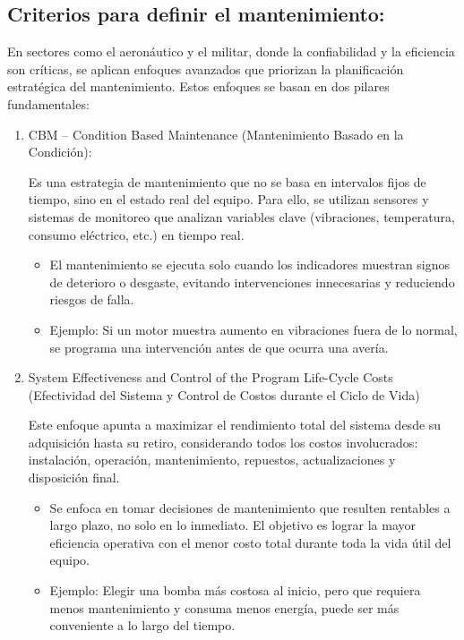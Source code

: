 \documentclass[a4paper,oneside,11pt]{article}
\begin{document}
\subsection{Criterios para definir el mantenimiento:}
En sectores como el aeronáutico y el militar, donde la confiabilidad y la eficiencia son críticas, se aplican enfoques avanzados que priorizan la planificación estratégica del mantenimiento. Estos enfoques se basan en dos pilares fundamentales:
\begin{enumerate}
    \item CBM – Condition Based Maintenance (Mantenimiento Basado en la Condición):

    Es una estrategia de mantenimiento que no se basa en intervalos fijos de tiempo, sino en el estado real del equipo. Para ello, se utilizan sensores y sistemas de monitoreo que analizan variables clave (vibraciones, temperatura, consumo eléctrico, etc.) en tiempo real.
    \begin{itemize}
        \item El mantenimiento se ejecuta solo cuando los indicadores muestran signos de deterioro o desgaste, evitando intervenciones innecesarias y reduciendo riesgos de falla.

        \item Ejemplo: Si un motor muestra aumento en vibraciones fuera de lo normal, se programa una intervención antes de que ocurra una avería.
    \end{itemize}
    \item System Effectiveness and Control of the Program Life-Cycle Costs (Efectividad del Sistema y Control de Costos durante el Ciclo de Vida)

    Este enfoque apunta a maximizar el rendimiento total del sistema desde su adquisición hasta su retiro, considerando todos los costos involucrados: instalación, operación, mantenimiento, repuestos, actualizaciones y disposición final.
    \begin{itemize}
        \item Se enfoca en tomar decisiones de mantenimiento que resulten rentables a largo plazo, no solo en lo inmediato. El objetivo es lograr la mayor eficiencia operativa con el menor costo total durante toda la vida útil del equipo.
        \item Ejemplo: Elegir una bomba más costosa al inicio, pero que requiera menos mantenimiento y consuma menos energía, puede ser más conveniente a lo largo del tiempo.
    \end{itemize}
\end{enumerate}
\end{document}
